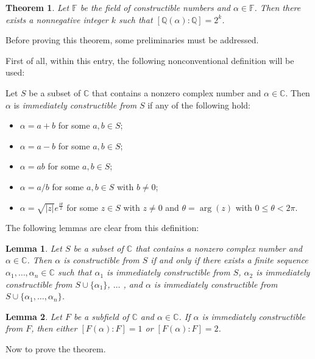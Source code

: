 \documentclass[12pt]{article}
\newtheorem{thm*}{Theorem}
\newtheorem{lemma}{Lemma}
\begin{document}
\begin{thm*}
Let $\mathbb{F}$ be the field of constructible numbers and $\alpha\in\mathbb{F}$.  Then there exists a nonnegative integer $k$ such that $[\mathbb{Q}(\alpha)\!:\!\mathbb{Q}]=2^k$.
\end{thm*}

Before proving this theorem, some preliminaries must be addressed.

First of all, within this entry, the following nonconventional definition will be used:

Let $S$ be a subset of $\mathbb{C}$ that contains a nonzero complex number and $\alpha\in\mathbb{C}$.  Then $\alpha$ is \emph{immediately constructible from} $S$ if any of the following hold:

\begin{itemize}
\item $\alpha=a+b$ for some $a,b\in S$;
\item $\alpha=a-b$ for some $a,b\in S$;
\item $\alpha=ab$ for some $a,b\in S$;
\item $\alpha=a/b$ for some $a,b\in S$ with $b\neq 0$;
\item $\alpha=\sqrt{|z|}e^{\frac{i\theta}{2}}$ for some $z\in S$ with $z \neq 0$ and $\theta=\operatorname{arg}(z)$ with $0\le\theta <2\pi$.
\end{itemize}

The following lemmas are clear from this definition:

\begin{lemma}
Let $S$ be a subset of $\mathbb{C}$ that contains a nonzero complex number and $\alpha\in\mathbb{C}$.  Then $\alpha$ is constructible from $S$ if and only if there exists a finite sequence $\alpha_1,\dots ,\alpha_n\in\mathbb{C}$ such that $\alpha_1$ is immediately constructible from $S$, $\alpha_2$ is immediately constructible from $S \cup \{\alpha_1\}$, $\dots$ , and $\alpha$ is immediately constructible from $S \cup \{\alpha_1,\dots ,\alpha_n\}$.
\end{lemma}

\begin{lemma}
Let $F$ be a subfield of $\mathbb{C}$ and $\alpha\in\mathbb{C}$.  If $\alpha$ is immediately constructible from $F$, then either $[F(\alpha)\!:\!F]=1$ or $[F(\alpha)\!:\!F]=2$.
\end{lemma}

Now to prove the theorem.
\end{document}
